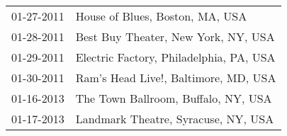 \begin{supertabular}{ll}
 01-27-2011 &          House of Blues, Boston, MA, USA \\
 01-28-2011 &      Best Buy Theater, New York, NY, USA \\
 01-29-2011 &  Electric Factory, Philadelphia, PA, USA \\
 01-30-2011 &     Ram's Head Live!, Baltimore, MD, USA \\
 01-16-2013 &      The Town Ballroom, Buffalo, NY, USA \\
 01-17-2013 &      Landmark Theatre, Syracuse, NY, USA \\
\end{supertabular}
